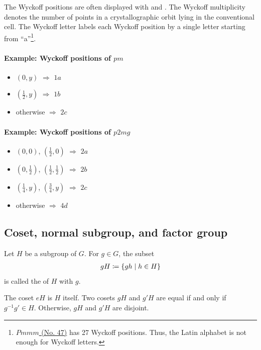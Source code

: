 The Wyckoff positions are often displayed with  and .
The Wyckoff multiplicity denotes the number of points in a crystallographic orbit lying in the conventional cell.
The Wyckoff letter labels each Wyckoff position by a single letter starting from ``a''\footnote{
  \href{https://www.cryst.ehu.es/cgi-bin/cryst/programs/nph-wp-list}{$Pmmm$ (No. 47)} has 27 Wyckoff positions.
  Thus, the Latin alphabet is not enough for Wyckoff letters.
}.

\paragraph{Example: Wyckoff positions of $pm$}

\begin{itemize}
  \item $(0, y)$ $\Rightarrow$ $1a$
  \item $\left( \frac{1}{2}, y \right)$ $\Rightarrow$ $1b$
  \item otherwise $\Rightarrow$ $2c$
\end{itemize}

\paragraph{Example: Wyckoff positions of $p2mg$}

\begin{itemize}
  \item $(0, 0)$, $\left( \frac{1}{2}, 0 \right)$ $\Rightarrow$ $2a$
  \item $\left( 0, \frac{1}{2} \right)$, $\left( \frac{1}{2}, \frac{1}{2} \right)$ $\Rightarrow$ $2b$
  \item $\left( \frac{1}{4}, y \right)$, $\left( \frac{3}{4}, y \right)$ $\Rightarrow$ $2c$
  \item otherwise $\Rightarrow$ $4d$
\end{itemize}

\subsection{Coset, normal subgroup, and factor group}

\begin{screen}
  \begin{defn}[coset]
    Let $H$ be a subgroup of $G$.
    For $g \in G$, the subset
    \begin{align}
      gH \coloneqq \left\{  gh  \mathrel{}\middle|\mathrel{}  h \in H \right\}
    \end{align}
    is called the  of $H$ with  $g$.
  \end{defn}
\end{screen}
The coset $eH$ is $H$ itself.
Two cosets $gH$ and $g'H$ are equal if and only if $g^{-1}g' \in H$.
Otherwise, $gH$ and $g'H$ are disjoint.

